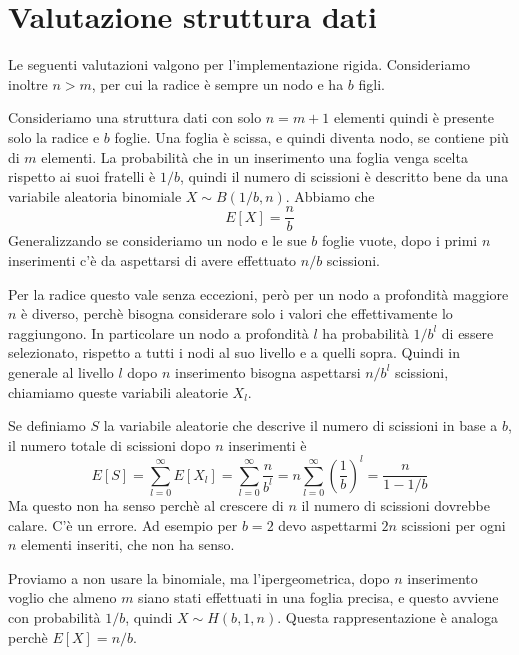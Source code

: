 \documentclass[a4paper]{article}
\begin{document}
\section{Valutazione struttura dati}
Le seguenti valutazioni valgono per l'implementazione rigida. Consideriamo inoltre $n > m$, per cui la radice è sempre un nodo e ha $b$ figli.

Consideriamo una struttura dati con solo $n = m + 1$ elementi quindi è presente solo la radice e $b$ foglie. Una foglia è scissa, e quindi diventa nodo, se contiene più di $m$ elementi. La probabilità che in un inserimento una foglia venga scelta rispetto ai suoi fratelli è $1/b$, quindi il numero di scissioni è descritto bene da una variabile aleatoria binomiale $X \sim B(1/b, n)$. Abbiamo che
$$ E[X] = \frac{n}{b} $$
Generalizzando se consideriamo un nodo e le sue $b$ foglie vuote, dopo i primi $n$ inserimenti c'è da aspettarsi di avere effettuato $n/b$ scissioni.

Per la radice questo vale senza eccezioni, però per un nodo a profondità maggiore $n$ è diverso, perchè bisogna considerare solo i valori che effettivamente lo raggiungono. In particolare un nodo a profondità $l$ ha probabilità $1/b^l$ di essere selezionato, rispetto a tutti i nodi al suo livello e a quelli sopra. Quindi in generale al livello $l$ dopo $n$ inserimento bisogna aspettarsi $n/b^l$ scissioni, chiamiamo queste variabili aleatorie $X_l$.

Se definiamo $S$ la variabile aleatorie che descrive il numero di scissioni in base a $b$, il numero totale di scissioni dopo $n$ inserimenti è
$$ E[S] = \sum_{l=0}^{\infty} E[X_l] = \sum_{l=0}^{\infty} \frac{n}{b^l} = n \sum_{l=0}^{\infty} \left(\frac{1}{b}\right)^l = \frac{n}{1 - 1/b}$$
Ma questo non ha senso perchè al crescere di $n$ il numero di scissioni dovrebbe calare. C'è un errore. Ad esempio per $b=2$ devo aspettarmi $2n$ scissioni per ogni $n$ elementi inseriti, che non ha senso.

Proviamo a non usare la binomiale, ma l'ipergeometrica, dopo $n$ inserimento voglio che almeno $m$ siano stati effettuati in una foglia precisa, e questo avviene con probabilità $1/b$, quindi $X \sim H(b, 1, n)$. Questa rappresentazione è analoga perchè $E[X] = n/b$.


\end{document}
